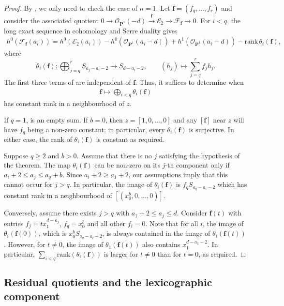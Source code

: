 \documentclass[leqno,11pt,a4paper]{amsart}
\theoremstyle{definition}
\numberwithin{equation}{section}
\newcommand{\PP}{\mathbf{P}}
\newcommand{\bff}{\boldsymbol{f}}
\newcommand{\EE}{\mathscr{E}}
\newcommand{\FF}{\mathscr{F}}
\newcommand{\OO}{\mathscr{O}}
\begin{document}
\begin{proof}
By , we only need to check the case of $n=1$.
Let $\bff=(f_q,\ldots,f_r)$ and consider the associated quotient $0\to\OO_{\PP^1}(-d)\xrightarrow{\bff}\EE_2\to\FF_{\bff}\to0$.
For $i<q$, the long exact sequence in cohomology and Serre duality gives 
\begin{align} \label{curve_h0}
h^0(\FF_{\bff}(a_i)) =h^0(\EE_2(a_i))-h^0(\OO_{\PP^1}(a_i-d)) +h^1(\OO_{\PP^1}(a_i-d))-\mathrm{rank}\,\theta_i(\bff),
\end{align}
where   
$$
\theta_i(\bff):\bigoplus_{j=q}^r S_{a_j-a_i-2} \longrightarrow S_{d-a_i-2},\qquad (h_j)\longmapsto\sum_{j=q}^r f_jh_j.
$$
The first three terms of  are independent of $\bff$. Thus, it suffices to determine when
\begin{align} \label{constant_fun} 
\bff \mapsto \bigoplus_{i<q}\theta_i(\bff)
\end{align}
has constant rank in a neighbourhood of $z$.

If $q=1$,  is an empty sum. 
If $b=0$, then $z = [1,0,\dots,0]$ and any $[\bff]$ near $z$ will have $f_q$ being a non-zero constant; in particular, every $\theta_i(\bff)$ is surjective. 
In either case, the rank of $\theta_i(\bff)$ is constant as required.

Suppose $q\geq2$ and $b>0$. Assume that there is no $j$ satisfying the hypothesis of the theorem. 
The map $\theta_i(\bff)$ can be non-zero on its $j$-th component only if $a_i +2 \leq a_j \leq a_q+b$. 
Since $a_i +2 \geq a_1+2$, our assumptions imply that this cannot occur for $j>q$. 
In particular, the image of $\theta_i(\bff)$ is $f_qS_{a_q-a_i-2}$ which has constant rank in a neighbourhood of $[(x_0^b,0,\dots,0)]$.

Conversely, assume there exists $j>q$ with $a_1+2 \leq a_j \leq d$.
Consider $\bff(t)$ with entries $f_j= tx_1^{d-a_j}$, $f_q=x_0^b$ and all other $f_i = 0$.
Note that for all $i$, the image of $\theta_i(\bff(0))$, which is $x_0^b S_{a_q-a_i-2}$, is always contained in the image of $\theta_i(\bff(t))$.
However, for $t \ne 0$, the image of $\theta_1(\bff(t))$ also contains $x_1^{d-a_1-2}$.
In particular, $\sum_{i<q}\mathrm{rank}(\theta_i(\bff))$ is larger for $t\ne 0$ than for $t=0$, as required.
\end{proof}


\subsection{Residual quotients and the lexicographic component}
\end{document}
